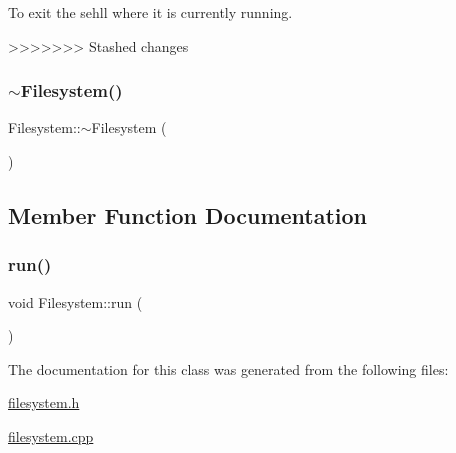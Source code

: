 To exit the sehll where it is currently running. 

>>>>>>> Stashed changes
\mbox{\label{class_filesystem_a8d4d73d3d4e56fd6792bdb83f6c5dfd8}} 
\subsubsection{\texorpdfstring{$\sim$\+Filesystem()}{~Filesystem()}}
{\footnotesize\ttfamily Filesystem\+::$\sim$\+Filesystem (\begin{DoxyParamCaption}{ }\end{DoxyParamCaption})\hspace{0.3cm}{\ttfamily [inline]}}



\subsection{Member Function Documentation}
\mbox{\label{class_filesystem_a373c34da491ec8d269cbc18d52a1ad79}} 
\subsubsection{\texorpdfstring{run()}{run()}}
{\footnotesize\ttfamily void Filesystem\+::run (\begin{DoxyParamCaption}{ }\end{DoxyParamCaption})}



The documentation for this class was generated from the following files\+:\begin{DoxyCompactItemize}
\item 
\hyperlink{filesystem_8h}{filesystem.\+h}\item 
\hyperlink{filesystem_8cpp}{filesystem.\+cpp}\end{DoxyCompactItemize}
